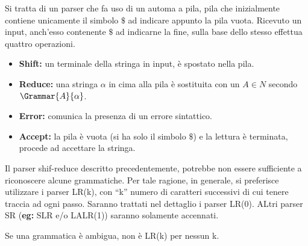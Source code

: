 \documentclass{subfiles}
\begin{document}
Si tratta di un parser che fa uso di un automa a pila, pila che inizialmente contiene unicamente il simbolo $\$$
ad indicare appunto la pila vuota. Ricevuto un input, anch'esso contenente $\$$ ad indicarne la fine,
sulla base dello stesso effettua quattro operazioni.
\begin{itemize}
    \item \textbf{Shift:} un terminale della stringa in input, è spostato nella pila.
    \item \textbf{Reduce:} una stringa $\alpha$ in cima alla pila è sostituita con un $A \in N$ secondo $\Grammar{A}{\alpha}$.
    \item \textbf{Error:} comunica la presenza di un errore sintattico.
    \item \textbf{Accept:} la pila è vuota (si ha solo il simbolo $\$$) e la lettura è terminata,
          procede ad accettare la stringa.
\end{itemize}

Il parser shif-reduce descritto precedentemente, potrebbe non essere sufficiente a riconoscere alcune grammatiche.
Per tale ragione, in generale, si preferisce utilizzare i parser LR(k), con ``k'' numero di caratteri successivi di cui tenere traccia ad ogni passo.
Saranno trattati nel dettaglio i parser LR(0). ALtri parser SR (\textbf{eg:} SLR e/o LALR(1)) saranno solamente accennati.

\begin{Remark*}
    Se una grammatica è ambigua, non è LR(k) per nessun k.
\end{Remark*}
\end{document}
